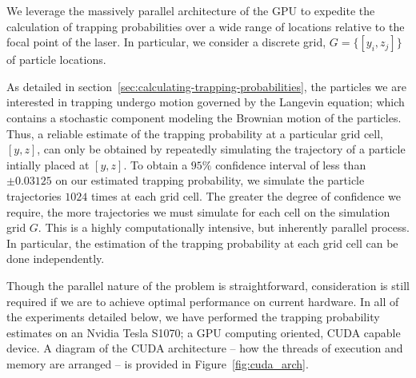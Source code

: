 We leverage the massively parallel architecture of the GPU to expedite
the calculation of trapping probabilities over a wide range of
locations relative to the focal point of the laser.  In particular, we
consider a discrete grid, $G = \{[y_{i},z_{j}]\}$ of particle
locations.  



As detailed in section~\ref{sec:calculating-trapping-probabilities},
the particles we are interested in trapping undergo motion governed
by the Langevin equation; which contains a stochastic component
modeling the Brownian motion of the particles.  Thus, a reliable
estimate of the trapping probability at a particular grid cell,
$[y,z]$, can only be obtained by repeatedly simulating the trajectory
of a particle intially placed at $[y,z]$.  To obtain a $95\%$
confidence interval of less than $\pm 0.03125$ on our estimated trapping probability, we 
simulate the particle trajectories $1024$ times at each grid cell.  The
greater the degree of confidence we require, the more trajectories we
must simulate for each cell on the simulation grid $G$.  This is a
highly computationally intensive, but inherently parallel process.  In
particular, the estimation of the trapping probability at each grid
cell can be done independently.

Though the parallel nature of the problem is straightforward,
consideration is still required if we are to achieve optimal
performance on current hardware.  In all of the experiments detailed
below, we have performed the trapping probability estimates on an
Nvidia Tesla S1070; a GPU computing oriented, CUDA capable device.  A
diagram of the CUDA architecture -- how the threads of execution and
memory are arranged -- is provided in Figure~\ref{fig:cuda_arch}.

